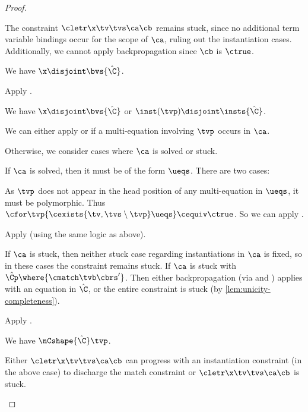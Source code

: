 \documentclass[acmsmall,screen,nonacm%
\Anonymous{,anonymous}{}%
\Final{}{,review}%
]{acmart}
\begin{document}
\begin{proof}
\begin{proofcases}
\begin{proofcases}
\begin{proofcases}

	    The constraint $\cletr \x \tv \tvs \ca \cb$ remains stuck, since
	    no additional term variable bindings occur for the scope of $\ca$,
	    ruling out the instantiation cases. Additionally, we cannot apply
	    backpropagation since $\cb$ is $\ctrue$.
	\end{proofcases}

	\begin{proofcases}
	  \proofcase{$\hat\C\where{\capp \x \t}$} We have $\x \disjoint \bvs {\hat\C}$.

	  Apply .

    \proofcase{$\hat\C\where{\cpapp \x \tvp \tvc \inst}$} We have $\x \disjoint \bvs {\hat\C}$ or $\inst(\tvp) \disjoint \insts {\hat\C}$.
	    \begin{itemize}
		\proofcase{$\tvp \in \reg \tv \tvs$}

		We can either apply  or 
		if a multi-equation involving $\tvp$ occurs in $\ca$.

		Otherwise, we consider cases where $\ca$ is solved or stuck.

		If $\ca$ is solved, then it must be of the form $\ueqs$.
		There are two cases:
		\begin{itemize}
		  \proofcase{$\cexists {\tv, \tvs} \ueqs \cequiv \ctrue$}
		  As $\tvp$ does not appear in the head position of any multi-equation in $\ueqs$,
		  it must be polymorphic. Thus $\cfor \tvp {\cexists {\tv, \tvs \setminus \tvp} \ueqs} \cequiv \ctrue$.
		  So we can apply .

		  \proofcase{$\cexists {\tv, \tvs} \ueqs \cnequiv \ctrue$}
		  Apply  (using the same logic as above).

		\end{itemize}

		If $\ca$ is stuck, then neither stuck case regarding instantiations
		in $\ca$ is fixed, so in these cases the constraint remains
		stuck. If $\ca$ is stuck with $\hat\Cp\where{\cmatch \tvb
    \cbrs'}$. Then either backpropagation (via  and )
		applies with an equation in $\hat\C$, or the entire constraint
    is stuck (by \cref{lem:unicity-completeness}).

		\proofcase{$\tvp \notin \reg \tv \tvs$} Apply .




	    \end{itemize}

	   We have $\nCshape {\hat\C} \tvp$.

	  Either $\cletr \x \tv \tvs \ca \cb$ can progress with an instantiation constraint (in the above case) to discharge
	  the match constraint or $\cletr \x \tv \tvs \ca \cb$ is stuck.
	\end{proofcases}
    \end{proofcases}
 \end{proofcases}
\end{proof}
\end{document}
